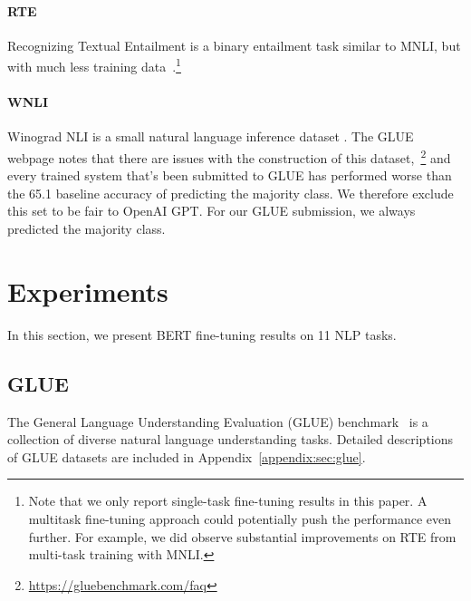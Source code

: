 \paragraph{RTE} Recognizing Textual Entailment is a binary entailment task similar to MNLI, but with much less training data~\cite{bentivogli-etal:2009}.\footnote{Note that we only report single-task fine-tuning results in this paper. A multitask fine-tuning approach could potentially push
the performance even further. For example, we did observe substantial improvements on RTE from multi-task training with MNLI.}

\paragraph{WNLI} Winograd NLI is a small natural language inference dataset \cite{levesque-davis-morgenstern:2011:_winog}. The GLUE webpage notes that there are issues with the construction of this dataset,~\footnote{\url{https://gluebenchmark.com/faq}} and every trained system that's been submitted to GLUE has performed worse than the 65.1 baseline accuracy of predicting the majority class. We therefore exclude this set to be fair to OpenAI GPT. For our GLUE submission, we always predicted the majority class.







\section{Experiments}
\label{sec:experiments}

In this section, we present BERT fine-tuning results on 11 NLP tasks. 

\subsection{GLUE}
\label{sec:glue}

The General Language Understanding Evaluation (GLUE) benchmark~\cite{wang-etal:2018:_glue} is a collection of diverse natural language understanding tasks.
Detailed descriptions of GLUE datasets are included in Appendix~\ref{appendix:sec:glue}.


